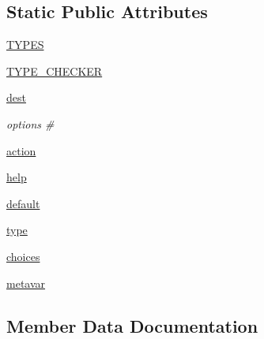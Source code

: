 \subsection*{Static Public Attributes}
\begin{DoxyCompactItemize}
\item 
\hyperlink{classpip_1_1__internal_1_1cli_1_1cmdoptions_1_1PipOption_a88d386d03915ea862a99ef4b2717a9dd}{T\+Y\+P\+ES}
\item 
\hyperlink{classpip_1_1__internal_1_1cli_1_1cmdoptions_1_1PipOption_a3ae228fafa6997e4041524396f657d36}{T\+Y\+P\+E\+\_\+\+C\+H\+E\+C\+K\+ER}
\item 
\hyperlink{classpip_1_1__internal_1_1cli_1_1cmdoptions_1_1PipOption_ac704c6da3d13930c4a422b59814c0c89}{dest}
\begin{DoxyCompactList}\small\item\em options \# \end{DoxyCompactList}\item 
\hyperlink{classpip_1_1__internal_1_1cli_1_1cmdoptions_1_1PipOption_a0a7c5bf69d56dcf2f75a0aa8c2e5db9c}{action}
\item 
\hyperlink{classpip_1_1__internal_1_1cli_1_1cmdoptions_1_1PipOption_afe4c27feb35dd5fdcc4dd4df378f9771}{help}
\item 
\hyperlink{classpip_1_1__internal_1_1cli_1_1cmdoptions_1_1PipOption_af289b9353ef870082fe45a941b76a613}{default}
\item 
\hyperlink{classpip_1_1__internal_1_1cli_1_1cmdoptions_1_1PipOption_a80e33649097a2a831ab6dd1b050937f3}{type}
\item 
\hyperlink{classpip_1_1__internal_1_1cli_1_1cmdoptions_1_1PipOption_a0da75b497841ad660a7a924508127567}{choices}
\item 
\hyperlink{classpip_1_1__internal_1_1cli_1_1cmdoptions_1_1PipOption_abf8782a640182855fbbf7f1f2fb3cfde}{metavar}
\end{DoxyCompactItemize}


\subsection{Member Data Documentation}
\mbox{\label{classpip_1_1__internal_1_1cli_1_1cmdoptions_1_1PipOption_a0a7c5bf69d56dcf2f75a0aa8c2e5db9c}} 
